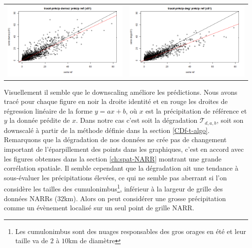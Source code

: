 \documentclass[a4paper,11pt]{article}
\begin{document}
\begin{tabular}{cc}
	\includegraphics[scale=0.4]{images/pr_4_ds.png} & \includegraphics[scale=0.4]{images/pr_4_dg.png}  \\
\end{tabular} 


Visuellement il semble que le downscaling améliore les prédictions. Nous avons tracé pour chaque figure en noir la droite identité et en rouge les droites de régression linéaire de la forme $y=ax+b$, où $x$ est la précipitation de référence et $y$ la donnée prédite de $x$. Dans notre cas c'est soit la dégradation $\mathcal{T}_{d,a,b}$, soit son downscalé à partir de la méthode définie dans la section \ref{CDf-t-algo}. Remarquons que la dégradation de nos données ne crée pas de changement important de l'éparpillement des points dans les graphiques, c'est en accord avec les figures obtenues dans la section \ref{ch:spat-NARR} montrant une grande corrélation spatiale. Il semble cependant que la dégradation ait une tendance à sous-évaluer les précipitations élevées, ce qui ne semble pas aberrant si l'on considère les tailles des cumulonimbus\footnote{Les cumulonimbus sont des nuages responsables des gros orages en été et leur taille va de $2$ à $10$km de diamètre}, inférieur à la largeur de grille des données NARRs ($32$km). Alors on peut considérer une grosse précipitation comme un évènement localisé sur un seul point de grille NARR.
\end{document}
